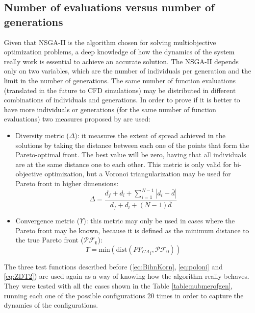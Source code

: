 \subsection{Number of evaluations versus number of generations}

Given that NSGA-II is the algorithm chosen for solving multiobjective optimization problems, a deep knowledge of how the dynamics of the system really work is essential to achieve an accurate solution. The NSGA-II depends only on two variables, which are the number of individuals per generation and the limit in the number of generations. The same number of function evaluations (translated in the future to CFD simulations) may be distributed in different combinations of individuals and generations. In order to prove if it is better to have more individuals or generations (for the same number of function evaluations) two measures proposed by \cite{deb2002fast} are used:
\begin{itemize}
    \item Diversity metric ($\Delta$): it measures the extent of spread achieved in the solutions by taking the distance between each one of the points that form the Pareto-optimal front. The best value will be zero, having that all individuals are at the same distance one to each other. This metric is only valid for bi-objective optimization, but a Voronoi triangularization may be used for Pareto front in higher dimensions: 
    \begin{equation}
        \displaystyle \Delta = \dfrac{d_f+d_l+\sum^{N-1}_{i=1}|d_i-\bar{d}|}{d_f+d_l+(N-1)\bar{d}}
    \end{equation}
\item Convergence metric ($\Upsilon$): this metric may only be used in cases where the Pareto front may be known, because it is defined as the minimum distance to the true Pareto front ($\mathcal{PF}_0$):
\begin{equation}
    \Upsilon =  \text{min} (\text{dist}({PF_{GA}}_i,\mathcal{PF}_0)) 
\end{equation}
\end{itemize}


\newpage

The three test functions described before (\ref{eq:BihnKorn}, \ref{eq:poloni} and \ref{eq:ZDT2}) are used again as a way of knowing how the algorithm really behaves. They were tested with all the cases shown in the Table \ref{table:nubmerofgen}, running each one of the possible configurations 20 times in order to capture the dynamics of the configurations.

